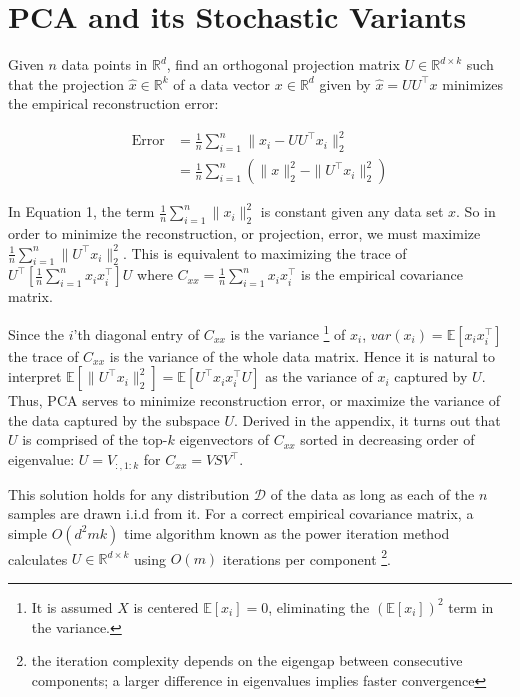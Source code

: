 \documentclass[11pt,letterpaper]{article}
\begin{document}
\section{PCA and its Stochastic Variants}

Given $n$ data points in $\mathbb{R}^d$, find an orthogonal projection matrix $U \in \mathbb{R}^{d \times k}$ such that the projection $\hat{x} \in \mathbb{R}^k$ of a data vector $x \in \mathbb{R}^{d}$ given by $\hat{x}=UU^\top x$ minimizes the empirical reconstruction error:

\begin{equation}
\begin{aligned}
\text{Error} &= \frac{1}{n} \sum_{i=1}^n \| x_i-UU^\top x_i \|^2_2 \\
&=\frac{1}{n}\sum_{i=1}^n \left(\|x\|_2^2- \|U^\top x_i\|_2^2 \right)
\end{aligned}
\end{equation}

In Equation 1, the term $\frac{1}{n} \sum_{i=1}^n \| x_i \|^2_2$ is constant given any data set $x$. So in order to minimize the reconstruction, or projection, error, we must maximize $\frac{1}{n} \sum_{i=1}^n \|U^\top x_i\|_2^2$. This is equivalent to maximizing the trace of $U^\top {\left[\displaystyle \frac{1}{n} \sum_{i=1}^n x_i x_i^\top \right]} U$ where $C_{xx} = \frac{1}{n} \sum_{i=1}^n x_i x_i^\top $ is the empirical covariance matrix.

Since the $i$'th diagonal entry of $C_{xx}$ is the variance \footnote{It is assumed $X$ is centered $\mathbb{E}[x_i] = 0$, eliminating the $(\mathbb{E}[x_i])^2$ term in the variance.} of $x_i$, $var(x_i) = \mathbb{E}[x_i x_i^{\top}]$ the trace of $C_{xx}$ is the variance of the whole data matrix. Hence it is natural to interpret $ \mathbb{E}[\|U^\top x_i\|_2^2] =  \mathbb{E}[U^\top x_ix_i^{\top}U]$ as the variance of $x_i$ captured by $U$. Thus, PCA serves to minimize reconstruction error, or maximize the variance of the data captured by the subspace $U$. Derived in the appendix, it turns out that $U$ is comprised of the top-$k$ eigenvectors of $C_{xx}$ sorted in decreasing order of eigenvalue: $U = V_{:, 1:k}$ for $C_{xx} = VSV^{\top}$. 

This solution holds for any distribution $\mathcal{D}$ of the data as long as each of the $n$ samples are drawn i.i.d from it. For a correct empirical covariance matrix, a simple $O(d^2mk)$ time algorithm known as the power iteration method calculates $U \in \mathbb{R}^{d \times k}$ using $O(m)$ iterations per component \footnote{the iteration complexity depends on the eigengap between consecutive components; a larger difference in eigenvalues implies faster convergence}. 
\end{document}
